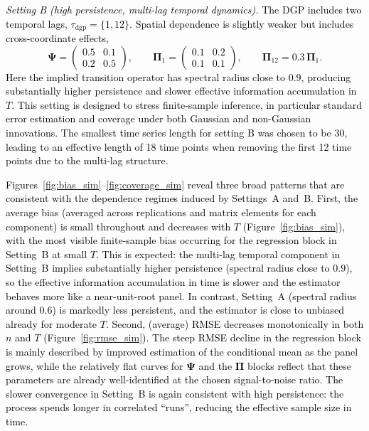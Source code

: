 \documentclass[12pt]{article}
\theoremstyle{plain}
\theoremstyle{definition}
\newcommand{\xmat}{\mathbf}
\begin{document}
\textcolor{black}{
\emph{Setting B (high persistence, multi-lag temporal dynamics).} The DGP includes two temporal lags, $\tau_{\text{dgp}}=\{1,12\}$. Spatial dependence is slightly weaker but includes cross-coordinate effects,
\[
\mathbf\Psi=
\begin{pmatrix}
0.5 & 0.1\\
0.2 & 0.5
\end{pmatrix},
\qquad
\mathbf\Pi_{1}=
\begin{pmatrix}
0.1 & 0.2\\
0.1 & 0.1
\end{pmatrix},
\qquad
\mathbf\Pi_{12}=0.3\,\mathbf\Pi_{1}.
\]
Here the implied transition operator has spectral radius close to $0.9$, producing substantially higher persistence and slower effective information accumulation in $T$. This setting is designed to stress finite-sample inference, in particular standard error estimation and coverage under both Gaussian and non-Gaussian innovations. The smallest time series length for setting B was chosen to be 30, leading to an effective length of 18 time points when removing the first 12 time points due to the multi-lag structure.}


\textcolor{black}{
Figures~\ref{fig:bias_sim}--\ref{fig:coverage_sim} reveal three broad patterns that are consistent with the dependence regimes induced by Settings~A and~B. First, the average bias (averaged across replications and matrix elements for each component) is small throughout and decreases with $T$ (Figure~\ref{fig:bias_sim}), with the most visible finite-sample bias occurring for the regression block in Setting~B at small $T$. This is expected: the multi-lag temporal component in Setting~B implies substantially higher persistence (spectral radius close to $0.9$), so the effective information accumulation in time is slower and the estimator behaves more like a near-unit-root panel. In contrast, Setting~A (spectral radius around $0.6$) is markedly less persistent, and the estimator is close to unbiased already for moderate $T$. Second, (average) RMSE decreases monotonically in both $n$ and $T$ (Figure~\ref{fig:rmse_sim}). The steep RMSE decline in the regression block is mainly described by improved estimation of the conditional mean as the panel grows, while the relatively flat curves for $\xmat{\Psi}$ and the $\xmat{\Pi}$ blocks reflect that these parameters are already well-identified at the chosen signal-to-noise ratio. The slower convergence in Setting~B is again consistent with high persistence: the process spends longer in correlated ``runs'', reducing the effective sample size in time.}
\end{document}
